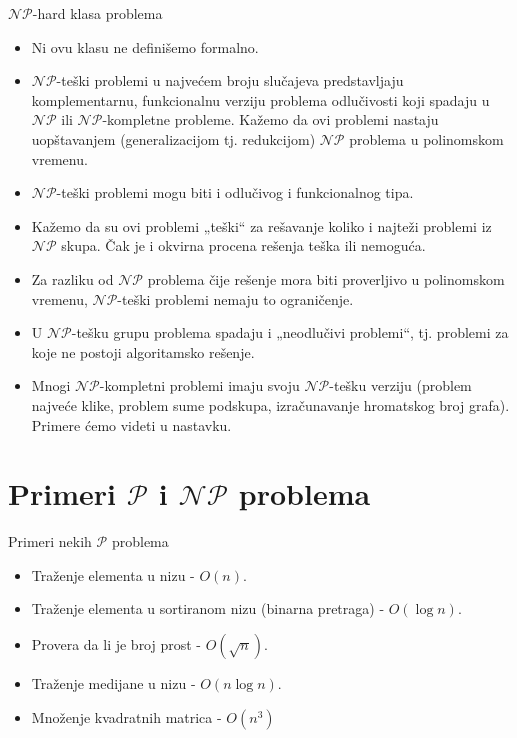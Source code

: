 \documentclass[aspectratio=169, xcolor=table, 10pt]{beamer}
\theoremstyle{definition}
\begin{document}
\begin{frame}{$\mathcal{NP}$-hard klasa problema}
\begin{itemize}
\item Ni ovu klasu ne defini\v semo formalno.
\item $\mathcal{NP}$-teški problemi u najvećem broju slučajeva predstavljaju komplementarnu, funkcionalnu verziju problema odlučivosti koji spadaju u $\mathcal{NP}$ ili $\mathcal{NP}$-kompletne probleme. Kažemo da ovi problemi nastaju uopštavanjem (generalizacijom tj. redukcijom) $\mathcal{NP}$ problema u polinomskom vremenu.

\item $\mathcal{NP}$-teški problemi mogu biti i odlučivog i funkcionalnog tipa.

\item Kažemo da su ovi problemi „teški“ za rešavanje koliko i najteži problemi iz $\mathcal{NP}$ skupa. Čak je i okvirna procena rešenja teška ili nemoguća.

\item Za razliku od $\mathcal{NP}$ problema čije rešenje mora biti proverljivo u polinomskom vremenu, $\mathcal{NP}$-teški problemi nemaju to ograničenje.

\item U $\mathcal{NP}$-tešku grupu problema spadaju i „neodlučivi problemi“, tj. problemi za koje ne postoji algoritamsko rešenje.

\item Mnogi $\mathcal{NP}$-kompletni problemi imaju svoju $\mathcal{NP}$-tešku verziju (problem najveće klike, problem sume podskupa, izračunavanje hromatskog broj grafa). Primere \' cemo videti u nastavku.
\end{itemize}
\end{frame}

\section{Primeri $\mathcal{P}$ i $\mathcal{NP}$ problema}

\begin{frame}{Primeri nekih $\mathcal{P}$ problema}

\begin{itemize}
    \item<1-> Tra\v zenje elementa u nizu - $O(n)$.
    \item<2-> Tra\v zenje elementa u sortiranom nizu (binarna pretraga) - $O(\log n)$.
    \item<3-> Provera da li je broj prost - $O(\sqrt{n})$.
    \item<4-> Tra\v zenje medijane u nizu - $O(n \log n)$.
    \item<5-> Mno\v zenje kvadratnih matrica - $O(n^3)$
\end{itemize}

\end{frame}
\end{document}

